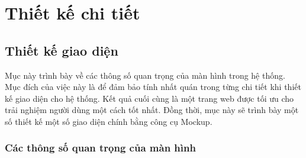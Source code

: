 \documentclass[../DoAn.tex]{subfiles}
\begin{document}
\section{Thiết kế chi tiết}
\subsection{Thiết kế giao diện}
Mục này trình bày về các thông số quan trọng của màn hình trong hệ thống. Mục đích của việc này là để đảm bảo tính nhất quán trong từng chi tiết khi thiết kế giao diện cho hệ thống. Kết quả cuối cùng là một trang web được tối ưu cho trải nghiệm người dùng một cách tốt nhất. Đồng thời, mục này sẽ trình bày một số thiết kế một số giao diện chính bằng công cụ Mockup.

\subsubsection{Các thông số quan trọng của màn hình}
\end{document}
